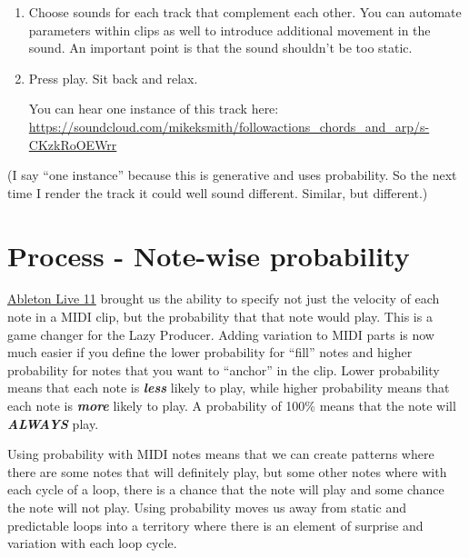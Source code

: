 \documentclass[
  12pt,
  letterpaper,
  oneside,
  open=any]{scrbook}
\begin{document}
\begin{enumerate}
\def\labelenumi{\arabic{enumi}.}
\setcounter{enumi}{7}
\item
  Choose sounds for each track that complement each other. You can
  automate parameters within clips as well to introduce additional
  movement in the sound. An important point is that the sound shouldn't
  be too static.
\item
  Press play. Sit back and relax.

  You can hear one instance of this track here:
  \href{https://soundcloud.com/mikeksmith/followactions_chords_and_arp/s-CKzkRoOEWrr?in=mikeksmith/sets/the-lazy-producer-recipes/s-PGMEWqfwKGz&si=e1846c9235ff47ad9ae0fa0cd5d52708&utm_source=clipboard&utm_medium=text&utm_campaign=social_sharing}{https://soundcloud.com/mikeksmith/followactions\_chords\_and\_arp/s-CKzkRoOEWrr}
\end{enumerate}

(I say ``one instance'' because this is generative and uses probability.
So the next time I render the track it could well sound different.
Similar, but different.)


\chapter{Process - Note-wise
probability}\label{Chapter-002-Process-Note_wise_probability}

\href{https://www.ableton.com/en/live-manual/11/welcome-to-live/\#welcome-to-live}{Ableton
Live 11} brought us the ability to specify not just the velocity of each
note in a MIDI clip, but the probability that that note would play. This
is a game changer for the Lazy Producer. Adding variation to MIDI parts
is now much easier if you define the lower probability for ``fill''
notes and higher probability for notes that you want to ``anchor'' in
the clip. Lower probability means that each note is \textbf{\emph{less}}
likely to play, while higher probability means that each note is
\textbf{\emph{more}} likely to play. A probability of 100\% means that
the note will \textbf{\emph{ALWAYS}} play.

\begin{tcolorbox}[enhanced jigsaw, colback=white, rightrule=.15mm, toprule=.15mm, arc=.35mm, opacitybacktitle=0.6, coltitle=black, leftrule=.75mm, bottomtitle=1mm, toptitle=1mm, left=2mm, bottomrule=.15mm, titlerule=0mm, colbacktitle=quarto-callout-tip-color!10!white, colframe=quarto-callout-tip-color-frame, title=\textcolor{quarto-callout-tip-color}{\faLightbulb}\hspace{0.5em}{Key idea}, breakable, opacityback=0]

Using probability with MIDI notes means that we can create patterns
where there are some notes that will definitely play, but some other
notes where with each cycle of a loop, there is a chance that the note
will play and some chance the note will not play. Using probability
moves us away from static and predictable loops into a territory where
there is an element of surprise and variation with each loop cycle.

\end{tcolorbox}
\end{document}
